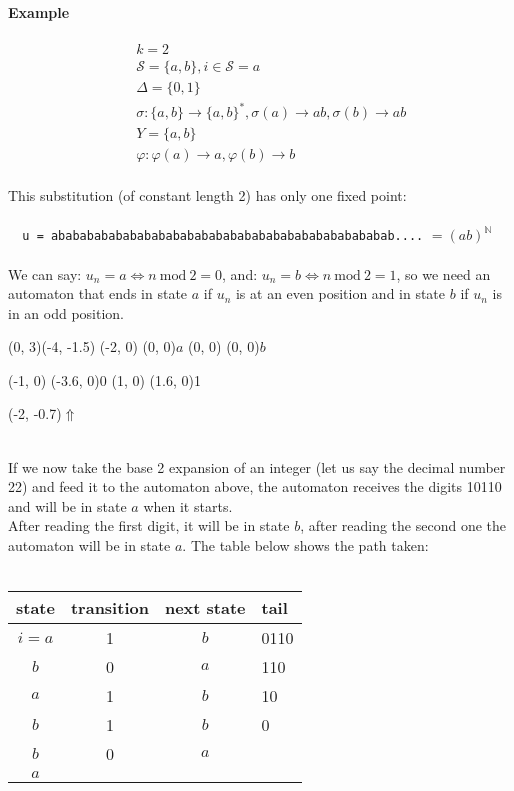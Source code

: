 \documentclass{article}
\begin{document}
\paragraph{Example}
\begin{eqnarray*}
&&k = 2\\
&&\mathcal{S} = \{a, b\}, i \in \mathcal{S} = a\\
&&\Delta = \{0, 1\}\\
&&\sigma:\{a, b\} \rightarrow \{a, b\}^*, \sigma(a) \rightarrow ab,
\sigma(b) \rightarrow ab\\
&&Y = \{a, b\}\\
&&\varphi: \varphi(a) \rightarrow a, \varphi(b) \rightarrow b
\end{eqnarray*}
\\
This substitution (of constant length 2) has only one fixed point:\\
\\
\verb#  u = abababababababababababababababababababababababab....#
$= (ab)^\mathbb{N}$\\
\\
We can say: $u_n = a \Leftrightarrow n \mathrm{\ mod\ } 2 = 0$, and:
$u_n = b \Leftrightarrow n \mathrm{\ mod\ } 2 = 1$, so we need an automaton
that ends in state $a$ if $u_n$ is at an even position and in state $b$ if
$u_n$ is in an odd position.\\
\begin{graph}(0, 3)(-4, -1.5)
  (-2, 0) (0, 0){$a$}
  (0, 0)  (0, 0){$b$}

  (-1, 0) \freetext(-3.6, 0){0}
   
   
  (1, 0) \freetext(1.6, 0){1}

  \freetext(-2, -0.7){$\Uparrow$}
\end{graph}\\
If we now take the base 2 expansion of an integer (let us say the decimal
number 22) and feed it to the automaton above, the automaton receives the
digits 10110 and will be in state $a$ when it starts.\\
After reading the first digit, it will be in state $b$, after reading the
second one the automaton will be in state $a$. The table below shows the path
taken:\\
\\
\begin{tabular}{c|c|c|l}
state & transition & next state & tail\\
\hline
$i=a$ & 1 & $b$ & 0110\\
$b$   & 0 & $a$ & 110\\
$a$   & 1 & $b$ & 10\\
$b$   & 1 & $b$ & 0\\
$b$   & 0 & $a$ &\\
$a$   &   &   &
\end{tabular}\\
\end{document}

